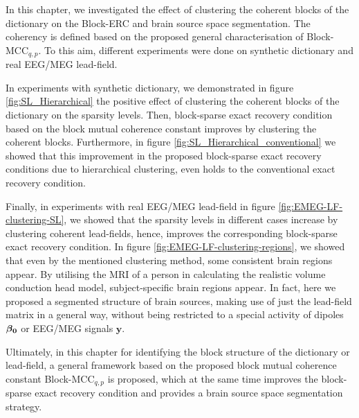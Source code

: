 In this chapter, we investigated the effect of clustering the coherent blocks of the dictionary on the Block-ERC and brain source space segmentation.
The coherency is defined based on the proposed general characterisation of Block-MCC$_{q,p}$.
To this aim, different experiments were done on synthetic dictionary and real EEG/MEG lead-field.

In experiments with synthetic dictionary, 
we demonstrated in figure \ref{fig:SL_Hierarchical} the positive effect of clustering the coherent blocks of the dictionary on the sparsity levels.
Then, block-sparse exact recovery condition based on the block mutual coherence constant improves by clustering the coherent blocks.
Furthermore, in figure \ref{fig:SL_Hierarchical_conventional} we showed that this improvement in the proposed block-sparse exact recovery conditions due to hierarchical clustering, even holds to the conventional exact recovery condition.  


Finally, in experiments with real EEG/MEG lead-field 
in figure \ref{fig:EMEG-LF-clustering-SL}, we showed that the sparsity levels in different cases increase by clustering coherent lead-fields, hence, improves the corresponding block-sparse exact recovery condition.
In figure \ref{fig:EMEG-LF-clustering-regions}, we showed that even by the mentioned clustering method, some consistent brain regions appear.
By utilising the MRI of a person in calculating the realistic volume conduction head model, subject-specific brain regions appear. 
In fact, here we proposed a segmented structure of brain sources, making use of just the lead-field matrix in a general way, without being restricted to a special activity of dipoles $\boldsymbol{\beta_0}$ or EEG/MEG signals $\boldsymbol{y}$.

Ultimately, in this chapter for identifying the block structure of the dictionary or lead-field, a general framework based on the proposed block mutual coherence constant Block-MCC$_{q,p}$ is proposed, which at the same time improves the block-sparse exact recovery condition and provides a brain source space segmentation strategy.



